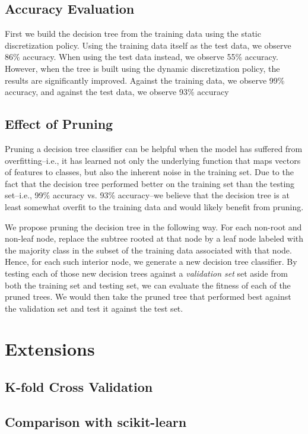 \documentclass[12pt, conference, compsocconf]{IEEEtran}
\begin{document}
\subsection{Accuracy Evaluation}
First we build the decision tree from the training data using the static discretization policy. 
Using the training data itself as the test data, we observe 86\% accuracy.
When using the test data instead, we observe 55\% accuracy.
However, when the tree is built using the dynamic discretization policy, the results are significantly improved.
Against the training data, we observe 99\% accuracy, and against the test data, we observe 93\% accuracy

\subsection{Effect of Pruning}
Pruning a decision tree classifier can be helpful when the model has suffered from overfitting--i.e., it has learned not only the underlying function that maps vectors of features to classes, but also the inherent noise in the training set. 
Due to the fact that the decision tree performed better on the training set than the testing set--i.e., 99\% accuracy vs. 93\% accuracy--we believe that the decision tree is at least somewhat overfit to the training data and would likely benefit from pruning. 

We propose pruning the decision tree in the following way. 
For each non-root and non-leaf node, replace the subtree rooted at that node by a leaf node labeled with the majority class in the subset of the training data associated with that node. 
Hence, for each such interior node, we generate a new decision tree classifier.
By testing each of those new decision trees against a \emph{validation set} set aside from both the training set and testing set, we can evaluate the fitness of each of the pruned trees. 
We would then take the pruned tree that performed best against the validation set and test it against the test set. 

\section{Extensions}

\subsection{K-fold Cross Validation}

\subsection{Comparison with scikit-learn}
\end{document}
